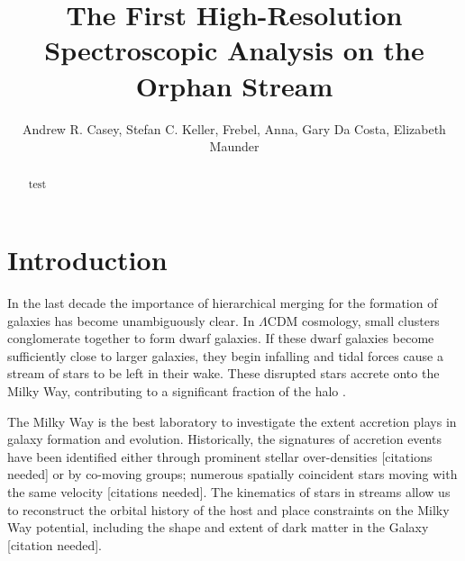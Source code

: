 \documentclass{emulateapj}
\begin{document}
\title{The First High-Resolution Spectroscopic Analysis on the Orphan Stream}

\author{Andrew R. Casey, Stefan C. Keller, Frebel, Anna, Gary Da Costa, Elizabeth Maunder}


\begin{abstract}
test
\end{abstract}


\section{Introduction}

In the last decade the importance of hierarchical merging for the formation of galaxies has become unambiguously clear. In $\Lambda$CDM cosmology, small clusters conglomerate together to form dwarf galaxies. If these dwarf galaxies become sufficiently close to larger galaxies, they begin infalling and tidal forces cause a stream of stars to be left in their wake. These disrupted stars accrete onto the Milky Way, contributing to a significant fraction of the halo \citet{Bell;et-al_2008}.

 

  The Milky Way is the best laboratory to investigate the extent accretion plays in galaxy formation and evolution. Historically, the signatures of accretion events have been identified either through prominent stellar over-densities [citations needed] or by co-moving groups; numerous spatially coincident stars moving with the same velocity [citations needed]. The kinematics of stars in streams allow us to reconstruct the orbital history of the host and place constraints on the Milky Way potential, including the shape and extent of dark matter in the Galaxy [citation needed]. 
 
\end{document}
